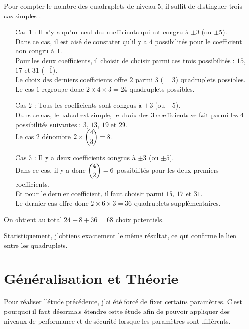 \documentclass[12pt, a4paper]{memoir}
\begin{document}
 \begin{Remarque}
  Pour compter le nombre des quadruplets de niveau $5$, il suffit de distinguer trois cas simples :
  \begin{itemize}
   \item [Cas $1$ :] Il n'y a qu'un seul des coefficients qui est congru à $\pm 3$ (ou $\pm 5$). \\
   Dans ce cas, il est aisé de constater qu'il y a $4$ possibilités pour le coefficient non congru à $1$. \\
   Pour les deux coefficients, il choisir de choisir parmi ces trois possibilités : $15$, $17$ et $31$ ($\pm \bar{1}$). \\
   Le choix des derniers coefficients offre $2$ parmi $3$ ($= 3$) quadruplets possibles. \\
   Le cas $1$ regroupe donc $2 \times 4 \times 3 = 24$ quadruplets possibles.
   \item [Cas $2$ :] Tous les coefficients sont congrus à $\pm 3$ (ou $\pm 5$). \\
   Dans ce cas, le calcul est simple, le choix des $3$ coefficients se fait parmi les $4$ possibilités suivantes :
   $3$, $13$, $19$ et $29$. \\
   Le cas $2$ dénombre $2 \times \dbinom{4}{3} = 8$.
   \item [Cas $3$ :] Il y a deux coefficients congrus à $\pm 3$ (ou $\pm 5$). \\
   Dans ce cas, il y a donc $\dbinom{4}{2} = 6$ possibilités pour les deux premiers coefficients. \\
   Et pour le dernier coefficient, il faut choisir parmi $15$, $17$ et $31$. \\
   Le dernier cas offre donc $2 \times 6 \times 3 = 36$ quadruplets supplémentaires.
  \end{itemize}
  
  On obtient au total $24 + 8 + 36 = 68$ choix potentiels.
  
  Statistiquement, j'obtiens exactement le même résultat, ce qui confirme le lien entre les quadruplets.
  \end{Remarque}

  \section{Généralisation et Théorie}
  
  Pour réaliser l'étude précédente, j'ai été forcé de fixer certains paramètres. C'est pourquoi il faut désormais 
  étendre cette étude afin de pouvoir appliquer des niveaux de performance et de sécurité lorsque les paramètres
  sont différents.
  
\end{document}
